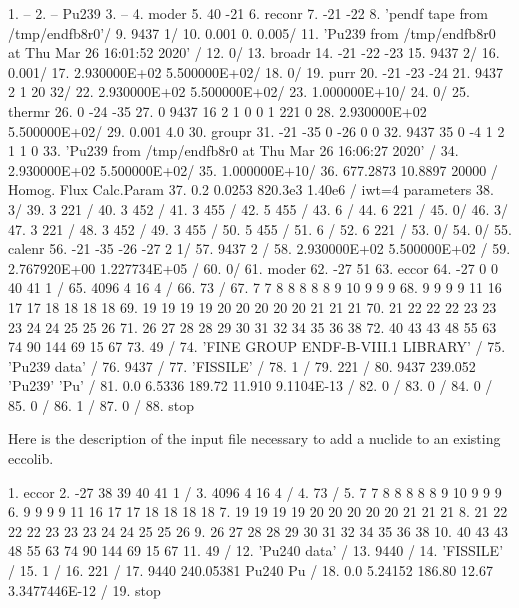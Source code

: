 \small
\begin{ccode}
  1.   --
  2.   -- Pu239
  3.   --
  4.   moder
  5.    40 -21
  6.   reconr
  7.    -21 -22
  8.    'pendf tape from /tmp/endfb8r0'/
  9.    9437 1/
 10.    0.001  0.  0.005/
 11.    'Pu239 from /tmp/endfb8r0 at Thu Mar 26 16:01:52 2020' /
 12.    0/
 13.   broadr
 14.    -21 -22 -23
 15.    9437 2/
 16.    0.001/
 17.    2.930000E+02 5.500000E+02/
 18.    0/
 19.   purr
 20.    -21 -23 -24
 21.    9437 2 1 20 32/
 22.    2.930000E+02 5.500000E+02/
 23.    1.000000E+10/
 24.    0/
 25.   thermr
 26.    0 -24 -35
 27.    0 9437 16 2 1 0 0 1 221 0
 28.    2.930000E+02 5.500000E+02/
 29.    0.001 4.0
 30.   groupr
 31.    -21 -35 0 -26 0 0
 32.    9437 35 0 -4 1 2 1 1 0
 33.    'Pu239 from /tmp/endfb8r0 at Thu Mar 26 16:06:27 2020' /
 34.    2.930000E+02 5.500000E+02/
 35.    1.000000E+10/
 36.    677.2873 10.8897 20000 / Homog. Flux Calc.Param
 37.    0.2 0.0253 820.3e3 1.40e6 / iwt=4 parameters
 38.    3/
 39.    3 221 /
 40.    3 452 /
 41.    3 455 /
 42.    5 455 /
 43.    6 /
 44.    6 221 /
 45.    0/
 46.    3/
 47.    3 221 /
 48.    3 452 /
 49.    3 455 /
 50.    5 455 /
 51.    6 /
 52.    6 221 /
 53.    0/
 54.    0/
 55.   calenr
 56.    -21 -35 -26 -27 2 1/
 57.    9437 2 /
 58.    2.930000E+02 5.500000E+02 /
 59.    2.767920E+00 1.227734E+05 /
 60.    0/
 61.   moder
 62.    -27 51
 63.   eccor
 64.    -27 0 0 40 41 1 /
 65.    4096 4 16 4 /
 66.    73 /
 67.      7   7   8   8   8   8   8   9  10   9   9   9
 68.      9   9   9   9  11  16  17  17  18  18  18  18
 69.     19  19  19  19  20  20  20  20  20  21  21  21
 70.     21  22  22  22  23  23  23  24  24  25  25  26
 71.     26  27  28  28  29  30  31  32  34  35  36  38
 72.     40  43  43  48  55  63  74  90 144  69  15  67
 73.     49 /
 74.    'FINE GROUP ENDF-B-VIII.1 LIBRARY' /
 75.    'Pu239 data' /
 76.    9437 /
 77.    'FISSILE' /
 78.    1 /
 79.    221 /
 80.    9437 239.052 'Pu239' 'Pu' /
 81.    0.0 6.5336 189.72 11.910 9.1104E-13 /
 82.    0 /
 83.    0 /
 84.    0 /
 85.    0 /
 86.    1 /
 87.    0 /
 88.   stop
\end{ccode}
\normalsize

Here is the description of the input file necessary to add a nuclide to an
existing eccolib.

\small
\begin{ccode}
  1.   eccor
  2.    -27 38 39 40 41 1 /
  3.    4096 4 16 4 /
  4.    73 /
  5.      7   7   8   8   8   8   8   9  10   9   9   9
  6.      9   9   9   9  11  16  17  17  18  18  18  18
  7.     19  19  19  19  20  20  20  20  20  21  21  21
  8.     21  22  22  22  23  23  23  24  24  25  25  26
  9.     26  27  28  28  29  30  31  32  34  35  36  38
 10.     40  43  43  48  55  63  74  90 144  69  15  67
 11.     49 /
 12.    'Pu240 data' /
 13.    9440 /
 14.    'FISSILE' /
 15.    1 /
 16.    221 /
 17.    9440 240.05381 Pu240 Pu /
 18.    0.0 5.24152 186.80 12.67 3.3477446E-12 /
 19.   stop
\end{ccode}
\normalsize

